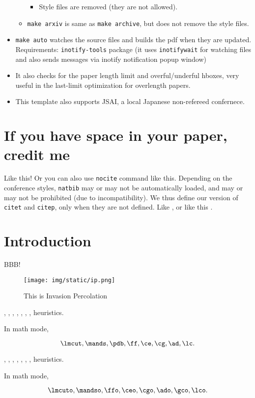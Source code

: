 \begin{itemize}
\begin{itemize}
    \begin{itemize}
    
    \item
      Style files are removed (they are not allowed).
    \end{itemize}
  \item
    \texttt{make\ arxiv} is same as \texttt{make\ archive}, but does not
    remove the style files.
  \end{itemize}
\item
  \texttt{make\ auto} watches the source files and builds the pdf when
  they are updated. Requirements: \texttt{inotify-tools} package (it
  uses \texttt{inotifywait} for watching files and also sends messages
  via inotify notification popup window)
\item
  It also checks for the paper length limit and overful/underful hboxes,
  very useful in the last-limit optimization for overlength papers.
\item
  This template also supports JSAI, a local Japanese non-refereed
  confernece.
\end{itemize}



\section{If you have space in your paper, credit me}

Like this! \cite{aaai-template}
Or you can also use \texttt{nocite} command like this. \nocite{aaai-template}
Depending on the conference styles,
\texttt{natbib} may or may not be automatically loaded,
and may or may not be prohibited (due to incompatibility).
We thus define our version of \texttt{citet} and \texttt{citep},
only when they are not defined.
Like \citet{aaai-template}, or like this \citep{aaai-template}.

\section{Introduction}

BBB!  \cite{Asai2016}

\begin{figure}[tb]
 \texttt{[image: img/static/ip.png]}
 \caption{This is Invasion Percolation}
 \label{fig:ip}
\end{figure}

\lmcut, \mands, \pdb, \ff, \ce, \cg, \ad, \lc heuristics.

In math mode,

\[
 \lmcut, \mands, \pdb, \ff, \ce, \cg, \ad, \lc.
\]

\lmcuto, \mandso, \ffo, \ceo, \cgo, \ado, \gco, \lco heuristics.

In math mode,

\[
 \lmcuto, \mandso, \ffo, \ceo, \cgo, \ado, \gco, \lco.
\]


